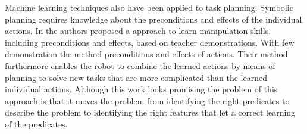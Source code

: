 Machine learning techniques also have been applied to task planning.   Symbolic planning requires knowledge about the preconditions and effects
of the individual actions. 
In \citep{abdo2013learning} the authors proposed a
approach to learn manipulation skills, including preconditions
and effects, based on teacher demonstrations.
With  few demonstration the  method  preconditions and effects of  actions. Their method furthermore enables the robot to combine the learned actions by means of planning to solve new tasks that are more complicated than the learned individual actions. 
Although this work looks promising\DM{,} the problem of this approach is that it moves the problem from identifying the right predicates to describe the problem to identifying the right features that let a correct learning of the predicates. 

